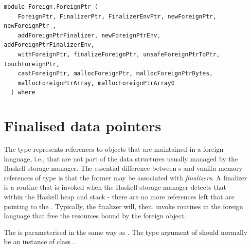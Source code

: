 \label{module:Foreign.ForeignPtr}
\haddockbeginheader
{\haddockverb\begin{verbatim}
module Foreign.ForeignPtr (
    ForeignPtr, FinalizerPtr, FinalizerEnvPtr, newForeignPtr, newForeignPtr_,
    addForeignPtrFinalizer, newForeignPtrEnv, addForeignPtrFinalizerEnv,
    withForeignPtr, finalizeForeignPtr, unsafeForeignPtrToPtr, touchForeignPtr,
    castForeignPtr, mallocForeignPtr, mallocForeignPtrBytes,
    mallocForeignPtrArray, mallocForeignPtrArray0
  ) where\end{verbatim}}
\haddockendheader

\section{Finalised data pointers}
\begin{haddockdesc}
\item[\begin{tabular}{@{}l}
data ForeignPtr a
\end{tabular}]
{\haddockbegindoc
The type  represents references to objects that are
 maintained in a foreign language, i.e., that are not part of the
 data structures usually managed by the Haskell storage manager.
 The essential difference between s and vanilla memory
 references of type  is that the former may be associated
 with \emph{finalizers}. A finalizer is a routine that is invoked when
 the Haskell storage manager detects that - within the Haskell heap
 and stack - there are no more references left that are pointing to
 the .  Typically, the finalizer will, then, invoke
 routines in the foreign language that free the resources bound by
 the foreign object.\par
The  is parameterised in the same way as .  The
 type argument of  should normally be an instance of
 class .\par}
\end{haddockdesc}
\begin{haddockdesc}
\item[\begin{tabular}{@{}l}
instance Show ForeignPtr a\\instance Eq ForeignPtr a\\instance Ord ForeignPtr a
\end{tabular}]
\end{haddockdesc}

